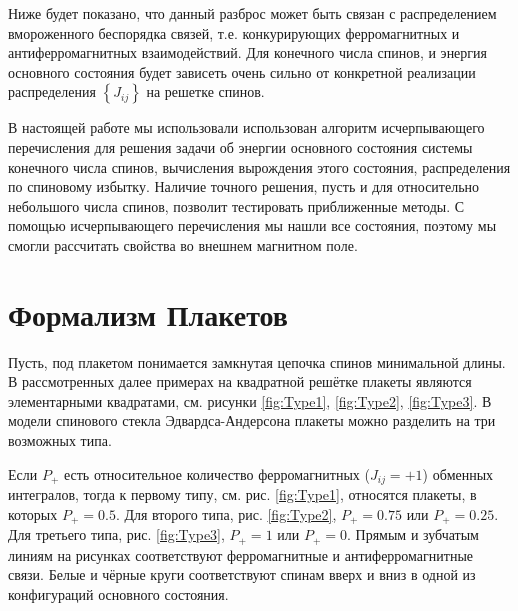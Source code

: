 \documentclass[utf8, babel, sor, jor, amsmath, amssymb, reprint]{elsarticle} %
\begin{document}
Ниже будет показано, что данный разброс может быть связан с распределением вмороженного беспорядка связей, т.е. конкурирующих ферромагнитных и антиферромагнитных взаимодействий. 
Для конечного числа спинов, и энергия основного состояния будет зависеть очень сильно от конкретной реализации распределения $\left\lbrace J_{ij} \right\rbrace $ на решетке спинов. 

В настоящей работе мы использовали использован алгоритм исчерпывающего перечисления \cite{padalko2021parallel} для решения задачи об энергии основного состояния системы конечного числа спинов, вычисления вырождения этого состояния, распределения по спиновому избытку. Наличие точного решения, пусть и для относительно небольшого числа спинов, позволит тестировать приближенные методы. С помощью исчерпывающего перечисления мы нашли все состояния, поэтому мы смогли рассчитать свойства во внешнем магнитном поле. 



\section{Формализм Плакетов}

Пусть, под плакетом понимается замкнутая цепочка спинов минимальной длины. В рассмотренных далее примерах на квадратной решётке плакеты являются элементарными квадратами, см. рисунки \ref{fig:Type1}, \ref{fig:Type2}, \ref{fig:Type3}. В модели спинового стекла Эдвардса-Андерсона плакеты можно разделить на три возможных типа. 

Если $P_+$ есть относительное количество ферромагнитных ($J_{ij}=+1$) обменных интегралов, тогда к первому типу, см. рис. \ref{fig:Type1}, относятся плакеты, в которых $P_+=0.5$. Для второго типа, рис. \ref{fig:Type2}, $P_+=0.75$ или $P_+=0.25$. Для третьего типа, рис. \ref{fig:Type3}, $P_+=1$ или $P_+=0$. Прямым и зубчатым линиям на рисунках соответствуют ферромагнитные и антиферромагнитные связи. Белые и чёрные круги соответствуют спинам вверх и вниз в одной из конфигураций основного состояния.
\end{document}
